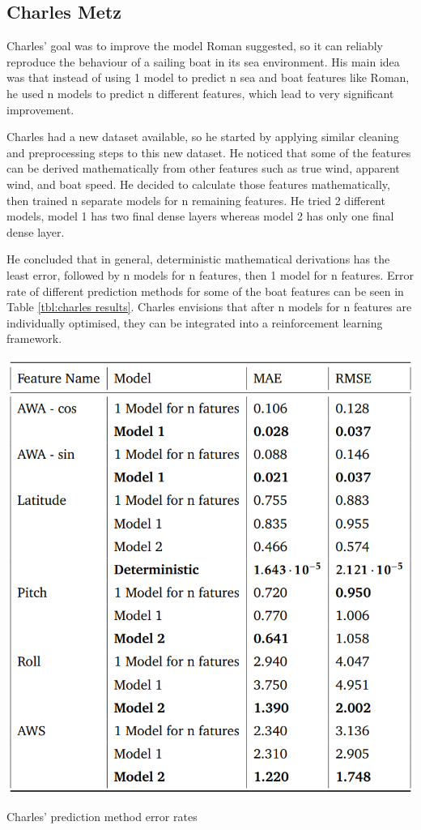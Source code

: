 \documentclass[12pt,twoside]{report}
\begin{document}
\subsection{Charles Metz}
Charles' goal was to improve the model Roman suggested, so it can reliably reproduce the behaviour of a sailing boat in its sea environment. His main idea was that instead of using 1 model to predict n sea and boat features like Roman, he used n models to predict n different features, which lead to very significant improvement. \cite{charles}

Charles had a new dataset available, so he started by applying similar cleaning and preprocessing steps to this new dataset. He noticed that some of the features can be derived mathematically from other features such as true wind, apparent wind, and boat speed. He decided to calculate those features mathematically, then trained n separate models for n remaining features. He tried 2 different models, model 1 has two final dense layers whereas model 2 has only one final dense layer.

He concluded that in general, deterministic mathematical derivations has the least error, followed by n models for n features, then 1 model for n features. Error rate of different prediction methods for some of the boat features can be seen in Table \ref{tbl:charles results}. Charles envisions that after n models for n features are individually optimised, they can be integrated into a reinforcement learning framework.

\begin{table}[h]
\centering
\includegraphics[width=0.55\linewidth]{figures/charles results.png}
\caption{Charles' prediction method error rates}
\label{tbl:charles results}
\end{table}
\end{document}
